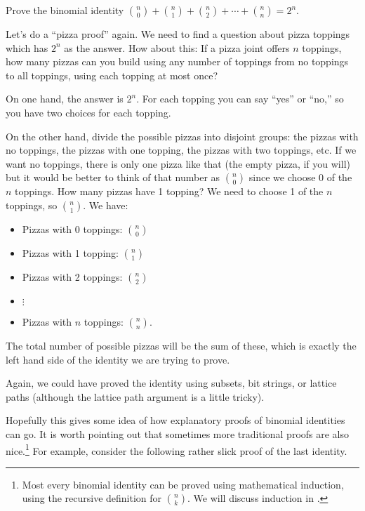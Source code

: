 \documentclass[12pt]{article}
\begin{document}
\begin{example}
  Prove the binomial identity ${n\choose 0} + {n \choose 1} + {n\choose 2} + \cdots + {n \choose n} = 2^n$.
  \begin{solution}
    Let's do a ``pizza proof'' again.  We need to find a question about pizza toppings which has $2^n$ as the answer.  How about this: If a pizza joint offers $n$ toppings, how many pizzas can you build using any number of toppings from no toppings to all toppings, using each topping at most once?
    
    On one hand, the answer is $2^n$.  For each topping you can say ``yes'' or ``no,'' so you have two choices for each topping.
    
    On the other hand, divide the possible pizzas into disjoint groups: the pizzas with no toppings, the pizzas with one topping, the pizzas with two toppings, etc.  If we want no toppings, there is only one pizza like that (the empty pizza, if you will) but it would be better to think of that number as ${n \choose 0}$ since we choose 0 of the $n$ toppings.  How many pizzas have 1 topping?  We need to choose 1 of the $n$ toppings, so ${n \choose 1}$.  We have:
    \begin{itemize}
      \item[] Pizzas with 0 toppings: ${n \choose 0}$
      \item[] Pizzas with 1 topping: ${n \choose 1}$
      \item[] Pizzas with 2 toppings: ${n \choose 2}$
      \item[] \qquad $\vdots$
      \item[] Pizzas with $n$ toppings: ${n \choose n}$.
    \end{itemize}
    The total number of possible pizzas will be the sum of these, which is exactly the left hand side of the identity we are trying to prove.  
    
    Again, we could have proved the identity using subsets, bit strings, or lattice paths (although the lattice path argument is a little tricky). 
  \end{solution}

\end{example}

Hopefully this gives some idea of how explanatory proofs of binomial identities can go.  It is worth pointing out that sometimes more traditional proofs are also nice.\footnote{Most every binomial identity can be proved using mathematical induction, using the recursive definition for ${n \choose k}$.  We will discuss induction in .}  For example, consider the following rather slick proof of the last identity.
\end{document}
